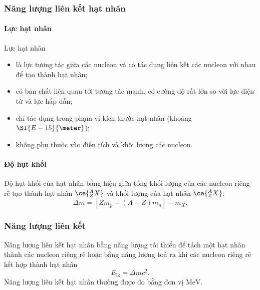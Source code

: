 \begin{tomtat}
	\subsubsection{Năng lượng liên kết hạt nhân}
	\paragraph{Lực hạt nhân}
	\begin{dn}
		Lực hạt nhân 
		\begin{itemize}
			\item là lực tương tác giữa các nucleon và có tác dụng liên kết các nucleon với nhau để tạo thành hạt nhân;
			\item  có bản chất liên quan tới tương tác mạnh, có cường độ rất lớn so với lực điện từ và lực hấp dẫn;
			\item  chỉ tác dụng trong phạm vi kích thước hạt nhân (khoảng $\SI{E-15}{\meter}$);
			\item  không phụ thuộc vào điện tích và khối lượng các nucleon.
		\end{itemize}
	\end{dn}
	\paragraph{Độ hụt khối}
\begin{dn}
		Độ hụt khối  của hạt nhân bằng hiệu giữa tổng khối lượng của các nucleon riêng rẽ tạo thành hạt nhân $\ce{^A_Z X}$ và khối lượng của hạt nhân $\ce{^A_Z X}$:
	\begin{equation}
		\Delta m=\left[Zm_p+\left(A-Z\right)m_n\right]-m_X.
	\end{equation}
\end{dn}
	\subsubsection{Năng lượng liên kết}
	\begin{dn}
		Năng lượng liên kết hạt nhân bằng năng lượng tối thiểu để tách một hạt nhân thành các nucleon riêng rẽ hoặc bằng năng lượng toả ra khi các nucleon riêng rẽ kết hợp thành hạt nhân
		\begin{equation}
			E_\text{lk}=\Delta mc^2.
		\end{equation}
		Năng lượng liên kết hạt nhân thường được đo bằng đơn vị $\si{\mega\electronvolt}$.
	\end{dn}

\end{tomtat}
